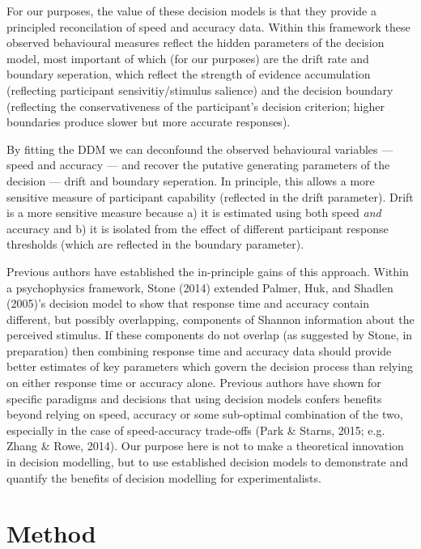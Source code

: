\documentclass[floatsintext,doc]{apa6}
\theoremstyle{definition}
\theoremstyle{definition}
\theoremstyle{definition}
\theoremstyle{remark}
\begin{document}
For our purposes, the value of these decision models is that they
provide a principled reconcilation of speed and accuracy data. Within
this framework these observed behavioural measures reflect the hidden
parameters of the decision model, most important of which (for our
purposes) are the drift rate and boundary seperation, which reflect the
strength of evidence accumulation (reflecting participant
sensivitiy/stimulus salience) and the decision boundary (reflecting the
conservativeness of the participant's decision criterion; higher
boundaries produce slower but more accurate responses).

By fitting the DDM we can deconfound the observed behavioural variables
--- speed and accuracy --- and recover the putative generating
parameters of the decision --- drift and boundary seperation. In
principle, this allows a more sensitive measure of participant
capability (reflected in the drift parameter). Drift is a more sensitive
measure because a) it is estimated using both speed \emph{and} accuracy
and b) it is isolated from the effect of different participant response
thresholds (which are reflected in the boundary parameter).

Previous authors have established the in-principle gains of this
approach. Within a psychophysics framework, Stone (2014) extended
Palmer, Huk, and Shadlen (2005)'s decision model to show that response
time and accuracy contain different, but possibly overlapping,
components of Shannon information about the perceived stimulus. If these
components do not overlap (as suggested by Stone, in preparation) then
combining response time and accuracy data should provide better
estimates of key parameters which govern the decision process than
relying on either response time or accuracy alone. Previous authors have
shown for specific paradigms and decisions that using decision models
confers benefits beyond relying on speed, accuracy or some sub-optimal
combination of the two, especially in the case of speed-accuracy
trade-offs (Park \& Starns, 2015; e.g. Zhang \& Rowe, 2014). Our purpose
here is not to make a theoretical innovation in decision modelling, but
to use established decision models to demonstrate and quantify the
benefits of decision modelling for experimentalists.

\section{Method}\label{method}
\end{document}
